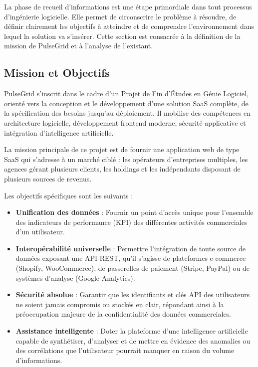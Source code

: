 ﻿\documentclass[12pt,a4paper,oneside]{report} %
\begin{document}
La phase de recueil d'informations est une étape primordiale dans tout processus d'ingénierie logicielle. Elle permet de circonscrire le problème à résoudre, de définir clairement les objectifs à atteindre et de comprendre l'environnement dans lequel la solution va s'insérer. Cette section est consacrée à la définition de la mission de PulseGrid et à l'analyse de l'existant.

\subsection{Mission et Objectifs}

PulseGrid s'inscrit dans le cadre d'un Projet de Fin d'Études en Génie Logiciel, orienté vers la conception et le développement d'une solution SaaS complète, de la spécification des besoins jusqu'au déploiement. Il mobilise des compétences en architecture logicielle, développement frontend moderne, sécurité applicative et intégration d'intelligence artificielle.

La mission principale de ce projet est de fournir une application web de type SaaS qui s'adresse à un marché ciblé : les opérateurs d'entreprises multiples, les agences gérant plusieurs clients, les holdings et les indépendants disposant de plusieurs sources de revenus. 

Les objectifs spécifiques sont les suivants :
\begin{itemize}
    \item \textbf{Unification des données} : Fournir un point d'accès unique pour l'ensemble des indicateurs de performance (KPI) des différentes activités commerciales d'un utilisateur.
    \item \textbf{Interopérabilité universelle} : Permettre l'intégration de toute source de données exposant une API REST, qu'il s'agisse de plateformes e-commerce (Shopify, WooCommerce), de passerelles de paiement (Stripe, PayPal) ou de systèmes d'analyse (Google Analytics).
    \item \textbf{Sécurité absolue} : Garantir que les identifiants et clés API des utilisateurs ne soient jamais compromis ou stockés en clair, répondant ainsi à la préoccupation majeure de la confidentialité des données commerciales.
    \item \textbf{Assistance intelligente} : Doter la plateforme d'une intelligence artificielle capable de synthétiser, d'analyser et de mettre en évidence des anomalies ou des corrélations que l'utilisateur pourrait manquer en raison du volume d'informations.
\end{itemize}
\end{document}
